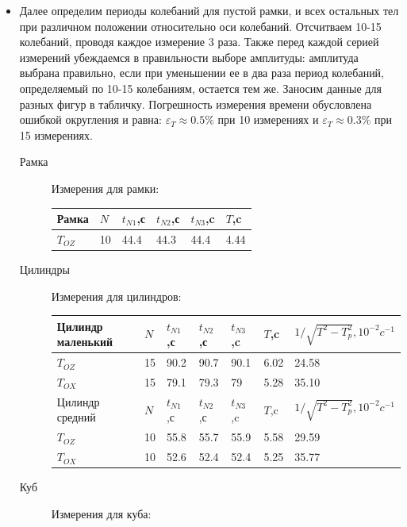 \documentclass[a4paper,12pt]{article} %
\begin{document}
\begin{itemize}
    \item Далее определим периоды колебаний для пустой рамки, и всех остальных тел при различном положении
относительно оси колебаний. Отсчитваем 10-15 колебаний, проводя каждое измерение 3 раза.
Также перед каждой серией измерений убеждаемся в правильности выборе амплитуды: амплитуда выбрана правильно, если при уменьшении ее
в два раза период колебаний, определяемый по 10-15 колебаниям, остается тем же. Заносим данные для разных фигур в табличку.
Погрешность измерения времени обусловлена ошибкой округления и равна: $\varepsilon_{T} \approx 0.5 \% $ при 10 измерениях и
$\varepsilon_{T} \approx 0.3 \% $ при 15 измерениях.
\begin{description}
    \item[Рамка]Измерения для рамки: 
    \begin{table}[!ht]
        \centering
        \begin{tabular}{|l|l|l|l|l|l|} \hline
            Рамка & $N$ & $t_{N1}$,с & $t_{N2}$,с & $t_{N3}$,c & $T$,c \\ \hline
            $T_{OZ}$ & 10 & 44.4 & 44.3 & 44.4 & 4.44  \\ \hline
        \end{tabular}
    \end{table}
    \item[Цилиндры]Измерения для цилиндров:
    \begin{table}[!ht]
        \centering
        \begin{tabular}{|l|l|l|l|l|l|l|}
        \hline
            Цилиндр маленький & $N$ & $t_{N1}$,с & $t_{N2}$,с & $t_{N3}$,c & $T$,c & $1/\sqrt{T^2-T^2_{p}}, 10^{-2} c^{-1}$  \\ \hline
            $T_{OZ}$ & 15 & 90.2 & 90.7 & 90.1 & 6.02 & 24.58  \\ \hline
            $T_{OX}$ & 15 & 79.1 & 79.3 & 79 & 5.28 & 35.10  \\ \hline
            Цилиндр средний & $N$ & $t_{N1}$,с & $t_{N2}$,с & $t_{N3}$,c & $T$,c & $1/\sqrt{T^2-T^2_{p}}, 10^{-2} c^{-1}$  \\ \hline
            $T_{OZ}$ & 10 & 55.8 & 55.7 & 55.9 & 5.58 & 29.59  \\ \hline
            $T_{OX}$ & 10 & 52.6 & 52.4 & 52.4 & 5.25 & 35.77  \\ \hline
        \end{tabular}
    \end{table}
    \item[Куб]Измерения для куба:
    \begin{table}[!ht]

\end{table}
\end{description}
\end{itemize}
\end{document}
